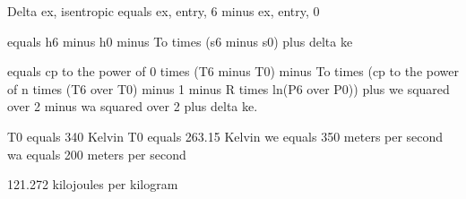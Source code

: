 Delta ex, isentropic equals ex, entry, 6 minus ex, entry, 0  

equals h6 minus h0 minus To times (s6 minus s0) plus delta ke  

equals cp to the power of 0 times (T6 minus T0) minus To times (cp to the power of n times (T6 over T0) minus 1 minus R times ln(P6 over P0)) plus we squared over 2 minus wa squared over 2 plus delta ke.  

T0 equals 340 Kelvin  
T0 equals 263.15 Kelvin  
we equals 350 meters per second  
wa equals 200 meters per second  

121.272 kilojoules per kilogram